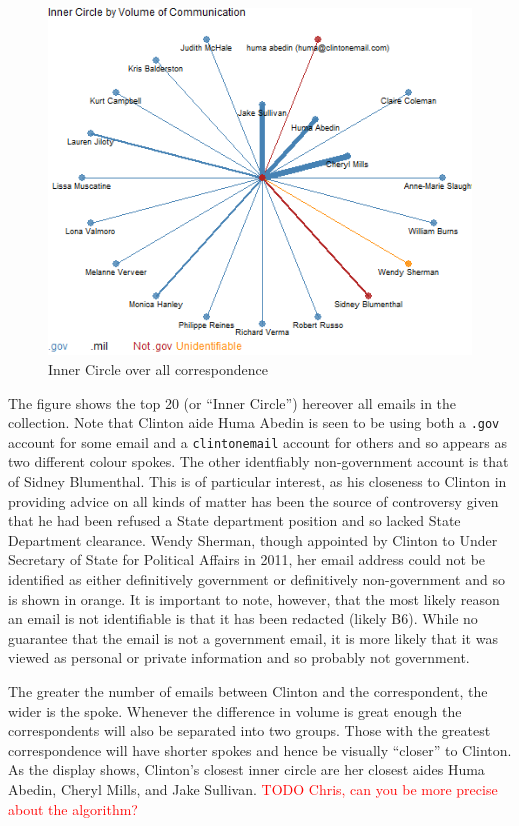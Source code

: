 \documentclass[journal]{vgtc}                %
\newcommand*{\TODO}[1]{\textcolor{red}{TODO #1}}
\begin{document}
\begin{figure}[h]
\begin{center}
\includegraphics[width=0.95\linewidth]{SpiralNetworkFullTime}
\caption{Inner Circle over all correspondence}
\label{fig:InnerCircleAll}
\end{center}
\end{figure}
The figure shows the top 20 (or ``Inner Circle'')  hereover all emails in the collection.
Note that Clinton aide Huma Abedin is seen to be using both a \texttt{.gov} account for some email and a \texttt{clintonemail} account for others and so appears as two different colour spokes.  The other identfiably non-government account is that of Sidney Blumenthal.  This is of particular interest, as his closeness to Clinton in providing advice on all kinds of matter has been the source of controversy \cite{BlumenthalControversy} given that he had been refused a State department position and so lacked  State Department clearance.  Wendy Sherman, though appointed by Clinton to  Under Secretary of State for Political Affairs in 2011, her email address could not be identified as either definitively government or definitively non-government and so is shown in orange.  It is important to note, however, that the most likely reason an email is not identifiable is that it has been redacted (likely B6).  While no guarantee that the email is not a government email, it is more likely that it was viewed as personal or private information and so probably not government.

The greater the number of emails between Clinton and the correspondent, the wider is the spoke.  Whenever the difference in volume is great enough the correspondents will also be separated into two groups.  Those with the greatest correspondence will have shorter spokes and hence be visually ``closer'' to Clinton.   As the display shows, Clinton's closest inner circle are her closest aides Huma Abedin, Cheryl Mills, and Jake Sullivan. \TODO{Chris, can you be more precise about the algorithm?}
\end{document}
